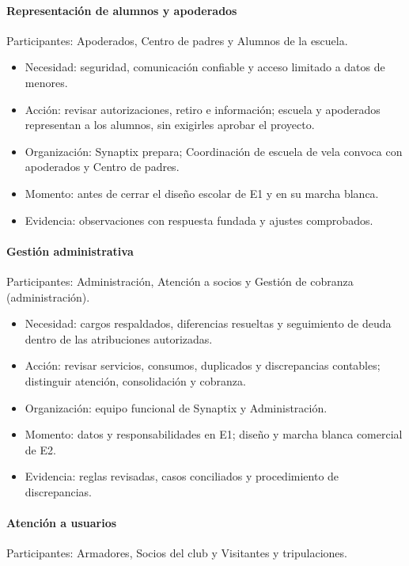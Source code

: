 \paragraph{Representación de alumnos y apoderados}
\mbox{}\par
\noindent Participantes: Apoderados, Centro de padres y Alumnos de la escuela.

\begin{itemize}
  \setlength{\itemsep}{2pt}
  \setlength{\parsep}{0pt}
  \item Necesidad: seguridad, comunicación confiable y acceso limitado a datos de menores.
  \item Acción: revisar autorizaciones, retiro e información; escuela y apoderados representan a los alumnos, sin exigirles aprobar el proyecto.
  \item Organización: Synaptix prepara; Coordinación de escuela de vela convoca con apoderados y Centro de padres.
  \item Momento: antes de cerrar el diseño escolar de E1 y en su marcha blanca.
  \item Evidencia: observaciones con respuesta fundada y ajustes comprobados.
\end{itemize}

\paragraph{Gestión administrativa}
\mbox{}\par
\noindent Participantes: Administración, Atención a socios y Gestión de cobranza (administración).

\begin{itemize}
  \setlength{\itemsep}{2pt}
  \setlength{\parsep}{0pt}
  \item Necesidad: cargos respaldados, diferencias resueltas y seguimiento de deuda dentro de las atribuciones autorizadas.
  \item Acción: revisar servicios, consumos, duplicados y discrepancias contables; distinguir atención, consolidación y cobranza.
  \item Organización: equipo funcional de Synaptix y Administración.
  \item Momento: datos y responsabilidades en E1; diseño y marcha blanca comercial de E2.
  \item Evidencia: reglas revisadas, casos conciliados y procedimiento de discrepancias.
\end{itemize}

\paragraph{Atención a usuarios}
\mbox{}\par
\noindent Participantes: Armadores, Socios del club y Visitantes y tripulaciones.

